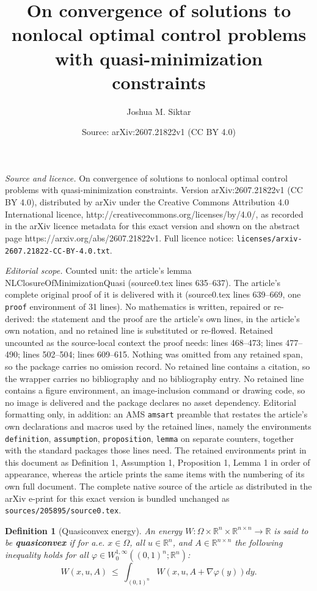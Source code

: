 \documentclass[10pt,a4paper]{amsart}
\title{On convergence of solutions to nonlocal optimal control problems with quasi-minimization constraints}
\author{Joshua M. Siktar}
\date{Source: arXiv:2607.21822v1 (CC BY 4.0)}
\newtheorem{definition}{Definition}
\def\Om{\Omega}
\def\R{\mathbb{R}}
\def\grad{\nabla}
\def\vphi{\varphi}
\begin{document}
\maketitle

\noindent\emph{Source and licence.} On convergence of solutions to nonlocal optimal control problems with quasi-minimization constraints. Version arXiv:2607.21822v1 (CC BY 4.0), distributed by arXiv under the Creative Commons Attribution 4.0 International licence, http://creativecommons.org/licenses/by/4.0/, as recorded in the arXiv licence metadata for this exact version and shown on the abstract page https://arxiv.org/abs/2607.21822v1. Full licence notice: \texttt{licenses/arxiv-2607.21822-CC-BY-4.0.txt}.\par\smallskip

\noindent\textit{Editorial scope.} Counted unit: the article's lemma NLClosureOfMinimizationQuasi (source0.tex lines 635--637). The article's complete original proof of it is delivered with it (source0.tex lines 639--669, one \texttt{proof} environment of 31 lines). No mathematics is written, repaired or re-derived: the statement and the proof are the article's own lines, in the article's own notation, and no retained line is substituted or re-flowed.  Retained uncounted as the source-local context the proof needs: lines 468--473; lines 477--490; lines 502--504; lines 609--615.  Nothing was omitted from any retained span, so the package carries no omission record.  No retained line contains a citation, so the wrapper carries no bibliography and no bibliography entry.  No retained line contains a figure environment, an image-inclusion command or drawing code, so no image is delivered and the package declares no asset dependency.  Editorial formatting only, in addition: an AMS \texttt{amsart} preamble that restates the article's own declarations and macros used by the retained lines, namely the environments \texttt{definition}, \texttt{assumption}, \texttt{proposition}, \texttt{lemma} on separate counters, together with the standard packages those lines need.  The retained environments print in this document as Definition 1, Assumption 1, Proposition 1, Lemma 1 in order of appearance, whereas the article prints the same items with the numbering of its own full document.  The complete native source of the article as distributed in the arXiv e-print for this exact version is bundled unchanged as \texttt{sources/205895/source0.tex}.
    \begin{definition}[Quasiconvex energy]\label{Def: qConvexEnergy}
		An energy $W: \Om \times \R^n \times \R^{n \times n} \rightarrow \R$ is said to be \textbf{quasiconvex} if for a.e. $x \in \Om$, all $u \in \R^n$, and $A \in \R^{n \times n}$ the following inequality holds for all $\vphi \in W^{1, \infty}_0((0, 1)^n; \R^n)$:
		\begin{equation}\label{eq: qConvexEnergy}
			W(x, u, A) \ \leq \ \int_{(0, 1)^n}W(x, u, A + \grad \vphi(y))dy.
		\end{equation}
	\end{definition}
\end{document}
